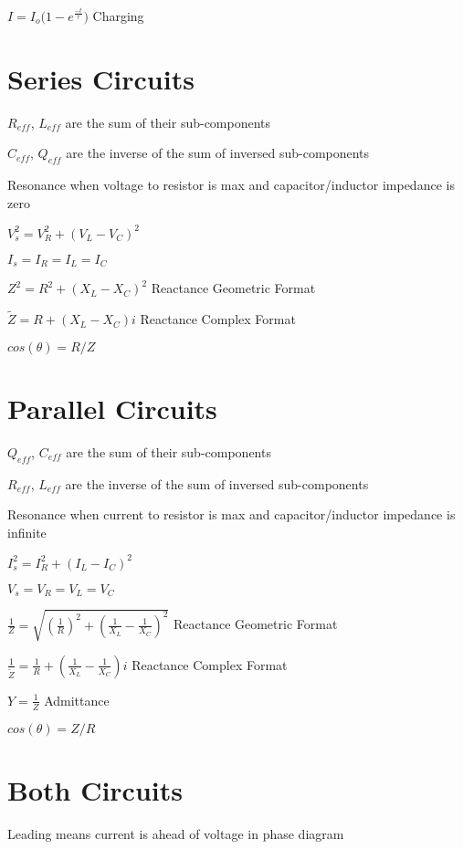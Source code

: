 \documentclass{article}
\begin{document}
\LARGE$I = I_o({1-e^{\frac{-t}{\tau} })}$
\large{Charging}



\section{Series Circuits}

\large {$R_{eff}$, $L_{eff}$ are the sum of their sub-components}

\large {$C_{eff}$, $Q_{eff}$ are the inverse of the sum of inversed sub-components }

\large {Resonance when voltage to resistor is max and capacitor/inductor impedance is zero}

\LARGE$V_s^2 =V_R^2+(V_L-V_C)^2$

\LARGE$I_s =I_R=I_L=I_C$

\LARGE$Z^2 =R^2+(X_L-X_C)^2$
\large Reactance Geometric Format

\LARGE$\widetilde{Z} =R+(X_L-X_C)i$
\large Reactance Complex Format


\LARGE$cos(\theta)=R/Z$

\section{Parallel Circuits}

\large {$Q_{eff}$, $C_{eff}$ are the sum of their sub-components}

\large {$R_{eff}$, $L_{eff}$ are the inverse of the sum of inversed sub-components }

\large {Resonance when current to resistor is max and capacitor/inductor impedance is infinite}


\LARGE$I_s^2 =I_R^2+(I_L-I_C)^2$

\LARGE$V_s =V_R=V_L=V_C$

\LARGE$\frac{1}{Z} =\sqrt{(\frac{1}{R})^2+(\frac{1}{X_L}-\frac{1}{X_C})^2}$ \large Reactance Geometric Format

\LARGE$\frac{1}{\widetilde{Z}} =\frac{1}{R}+
(\frac{1}{X_L}-\frac{1}{X_C})i$
\large Reactance Complex Format

\LARGE$Y=\frac{1}{Z}$
\large {Admittance}

\LARGE$cos(\theta)=Z/R$

\section{ Both Circuits}

\large {Leading means current is ahead of voltage in phase diagram}
\end{document}

